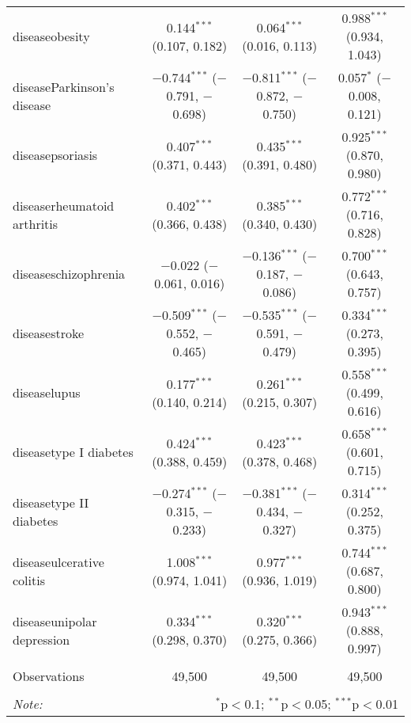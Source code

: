 \begin{table}[!htbp]
\begin{tabular}{@{\extracolsep{5pt}}lccc}
  diseaseobesity & 0.144$^{***}$ (0.107, 0.182) & 0.064$^{***}$ (0.016, 0.113) & 0.988$^{***}$ (0.934, 1.043) \\ 
  diseaseParkinson's disease & $-$0.744$^{***}$ ($-$0.791, $-$0.698) & $-$0.811$^{***}$ ($-$0.872, $-$0.750) & 0.057$^{*}$ ($-$0.008, 0.121) \\ 
  diseasepsoriasis & 0.407$^{***}$ (0.371, 0.443) & 0.435$^{***}$ (0.391, 0.480) & 0.925$^{***}$ (0.870, 0.980) \\ 
  diseaserheumatoid arthritis & 0.402$^{***}$ (0.366, 0.438) & 0.385$^{***}$ (0.340, 0.430) & 0.772$^{***}$ (0.716, 0.828) \\ 
  diseaseschizophrenia & $-$0.022 ($-$0.061, 0.016) & $-$0.136$^{***}$ ($-$0.187, $-$0.086) & 0.700$^{***}$ (0.643, 0.757) \\ 
  diseasestroke & $-$0.509$^{***}$ ($-$0.552, $-$0.465) & $-$0.535$^{***}$ ($-$0.591, $-$0.479) & 0.334$^{***}$ (0.273, 0.395) \\ 
  diseaselupus & 0.177$^{***}$ (0.140, 0.214) & 0.261$^{***}$ (0.215, 0.307) & 0.558$^{***}$ (0.499, 0.616) \\ 
  diseasetype I diabetes & 0.424$^{***}$ (0.388, 0.459) & 0.423$^{***}$ (0.378, 0.468) & 0.658$^{***}$ (0.601, 0.715) \\ 
  diseasetype II diabetes & $-$0.274$^{***}$ ($-$0.315, $-$0.233) & $-$0.381$^{***}$ ($-$0.434, $-$0.327) & 0.314$^{***}$ (0.252, 0.375) \\ 
  diseaseulcerative colitis & 1.008$^{***}$ (0.974, 1.041) & 0.977$^{***}$ (0.936, 1.019) & 0.744$^{***}$ (0.687, 0.800) \\ 
  diseaseunipolar depression & 0.334$^{***}$ (0.298, 0.370) & 0.320$^{***}$ (0.275, 0.366) & 0.943$^{***}$ (0.888, 0.997) \\ 
 \hline \\[-1.8ex] 
Observations & 49,500 & 49,500 & 49,500 \\ 
\hline 
\hline \\[-1.8ex] 
\textit{Note:}  & \multicolumn{3}{r}{$^{*}$p$<$0.1; $^{**}$p$<$0.05; $^{***}$p$<$0.01} \\ 
\end{tabular} 
\end{table} 
